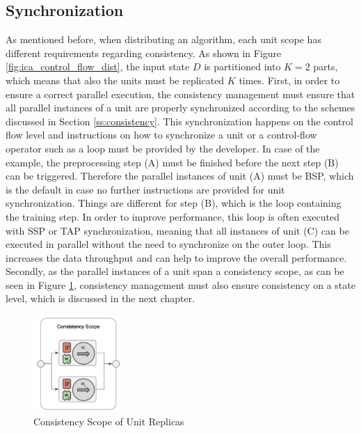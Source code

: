 \subsection{Synchronization}
\label{ss:synchronization}
As mentioned before, when distributing an algorithm, each unit scope has different requirements regarding consistency.
As shown in Figure \ref{fig:ica_control_flow_dist}, the input state $D$ is partitioned into $K = 2$ parts, which means that also the units must be replicated $K$ times.
First, in order to ensure a correct parallel execution, the consistency management must ensure that all parallel instances of a unit are properly synchronized according to the schemes discussed in Section \ref{ss:consistency}.
This synchronization happens on the control flow level and instructions on how to synchronize a unit or a control-flow operator such as a loop must be provided by the developer.
In case of the example, the preprocessing step (A) must be finished before the next step (B) can be triggered.
Therefore the parallel instances of unit (A) must be BSP, which is the default in case no further instructions are provided for unit synchronization.
Things are different for step (B), which is the loop containing the training step.
In order to improve performance, this loop is often executed with SSP or TAP synchronization, meaning that all instances of unit (C) can be executed in parallel without the need to synchronize on the outer loop.
This increases the data throughput and can help to improve the overall performance.
Secondly, as the parallel instances of a unit span a consistency scope, as can be seen in Figure \ref{fig:consistency_scope}, consistency management must also ensure consistency on a state level, which is discussed in the next chapter.
\begin{figure}[ht]
\centering
\includegraphics[width=0.3\textwidth]{img/consistency_scope.png}
\caption{Consistency Scope of Unit Replicas}
\label{fig:consistency_scope}
\end{figure}

